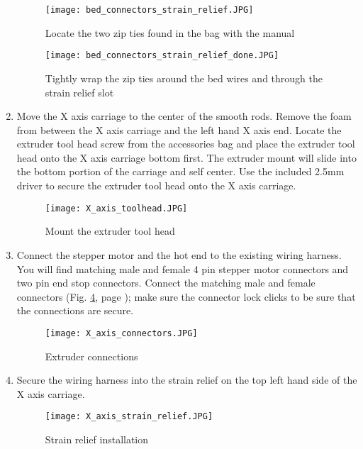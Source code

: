 \begin{enumerate}
\begin{figure}[H]
\centering
\texttt{[image: bed\_connectors\_strain\_relief.JPG]}
\caption{Locate the two zip ties found in the bag with the manual}
\label{fig:bed_connectors_strain_relief}
\end{figure}

\begin{figure}[H]
\centering
\texttt{[image: bed\_connectors\_strain\_relief\_done.JPG]}
\caption{Tightly wrap the zip ties around the bed wires and through the strain relief slot}
\label{fig:bed_connectors_strain_relief_done}
\end{figure}

\item Move the X axis carriage to the center of the smooth rods. Remove the foam from between the X axis carriage and the left hand X axis end. Locate the extruder tool head screw from the accessories bag and place the extruder tool head onto the X axis carriage bottom first. The extruder mount will slide into the bottom portion of the carriage and self center. Use the included 2.5mm driver to secure the extruder tool head onto the X axis carriage.
\begin{figure}[hp]
\centering
\texttt{[image: X\_axis\_toolhead.JPG]}
\caption{Mount the extruder tool head}
\label{fig:X_axis_toolhead}
\end{figure}

\item Connect the stepper motor and the hot end to the existing wiring harness.  You will find matching male and female 4 pin stepper motor connectors and two pin end stop connectors. Connect the matching male and female connectors (Fig. \ref{fig:X_axis_connectors}, page \pageref{fig:X_axis_connectors}); make sure the connector lock clicks to be sure that the connections are secure.
\begin{figure}[hp]
\centering
\texttt{[image: X\_axis\_connectors.JPG]}
\caption{Extruder connections}
\label{fig:X_axis_connectors}
\end{figure}

\item Secure the wiring harness into the strain relief on the top left hand side of the X axis carriage. 
\begin{figure}[hp]
\centering
\texttt{[image: X\_axis\_strain\_relief.JPG]}
\caption{Strain relief installation}
\label{fig:X_axis_strain_relief}
\end{figure}


\end{enumerate}
